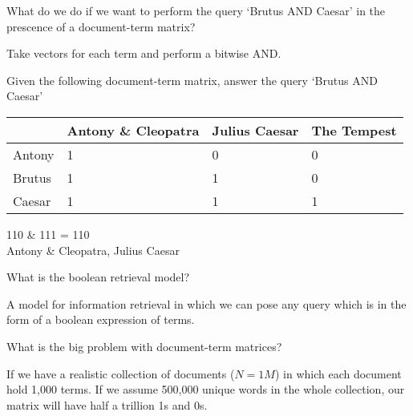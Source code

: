 \documentclass[2by4,grid]{flashcards}
\begin{document}
\begin{flashcard}{What do we do if we want to perform the query `Brutus AND Caesar' in the prescence of a document-term matrix?}
	\begin{center}
        Take vectors for each term and perform a bitwise AND.
	\end{center}
\end{flashcard}

\begin{flashcard}{
    Given the following document-term matrix, answer the query `Brutus AND Caesar' \\ \vspace{.4cm}
    \begin{tabular}{p{.6in}p{.8in}p{.6in}p{.7in}}
        \hline
        & Antony \& Cleopatra & Julius Caesar & The \newline Tempest \\
        \hline
        Antony & 1 & 0 & 0 \\
        Brutus & 1 & 1 & 0 \\
        Caesar & 1 & 1 & 1 \\
        \hline
    \end{tabular}
    }
	\begin{center}
        110 \& 111 = 110 \\ \vspace{.4cm}
        Antony \& Cleopatra, Julius Caesar
	\end{center}
\end{flashcard}

\begin{flashcard}{What is the boolean retrieval model?}
	\begin{center}
        A model for information retrieval in which we can pose any query which is in the form of a boolean expression of terms.
	\end{center}
\end{flashcard}

\begin{flashcard}{What is the big problem with document-term matrices?}
	\begin{center}
        If we have a realistic collection of documents ($N = 1M$) in which each document hold 1,000 terms. If we assume 500,000 unique words in the whole collection, our matrix will have half a trillion 1s and 0s.
	\end{center}
\end{flashcard}
\end{document}
